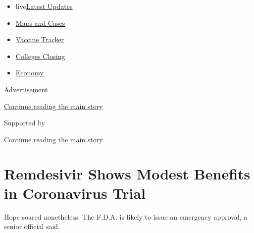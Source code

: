 \begin{itemize}
\tightlist
\item
  live\href{https://www.nytimes3xbfgragh.onion/2020/08/21/world/covid-19-coronavirus.html?name=styln-coronavirus-national\&region=TOP_BANNER\&variant=undefined\&block=storyline_menu_recirc\&action=click\&pgtype=Article\&impression_id=e865b920-e39e-11ea-af8e-ffa98621719b}{Latest
  Updates}
\item
  \href{https://www.nytimes3xbfgragh.onion/interactive/2020/us/coronavirus-us-cases.html?name=styln-coronavirus-national\&region=TOP_BANNER\&variant=undefined\&block=storyline_menu_recirc\&action=click\&pgtype=Article\&impression_id=e865b921-e39e-11ea-af8e-ffa98621719b}{Maps
  and Cases}
\item
  \href{https://www.nytimes3xbfgragh.onion/interactive/2020/science/coronavirus-vaccine-tracker.html?name=styln-coronavirus-national\&region=TOP_BANNER\&variant=undefined\&block=storyline_menu_recirc\&action=click\&pgtype=Article\&impression_id=e865b922-e39e-11ea-af8e-ffa98621719b}{Vaccine
  Tracker}
\item
  \href{https://www.nytimes3xbfgragh.onion/2020/08/19/us/colleges-closing-covid.html?name=styln-coronavirus-national\&region=TOP_BANNER\&variant=undefined\&block=storyline_menu_recirc\&action=click\&pgtype=Article\&impression_id=e865b923-e39e-11ea-af8e-ffa98621719b}{Colleges
  Closing}
\item
  \href{https://www.nytimes3xbfgragh.onion/live/2020/08/20/business/stock-market-today-coronavirus?name=styln-coronavirus-national\&region=TOP_BANNER\&variant=undefined\&block=storyline_menu_recirc\&action=click\&pgtype=Article\&impression_id=e865b924-e39e-11ea-af8e-ffa98621719b}{Economy}
\end{itemize}

Advertisement

\protect\hyperlink{after-top}{Continue reading the main story}

Supported by

\protect\hyperlink{after-sponsor}{Continue reading the main story}

\hypertarget{remdesivir-shows-modest-benefits-in-coronavirus-trial}{%
\section{Remdesivir Shows Modest Benefits in Coronavirus
Trial}\label{remdesivir-shows-modest-benefits-in-coronavirus-trial}}

Hope soared nonetheless. The F.D.A. is likely to issue an emergency
approval, a senior official said.

